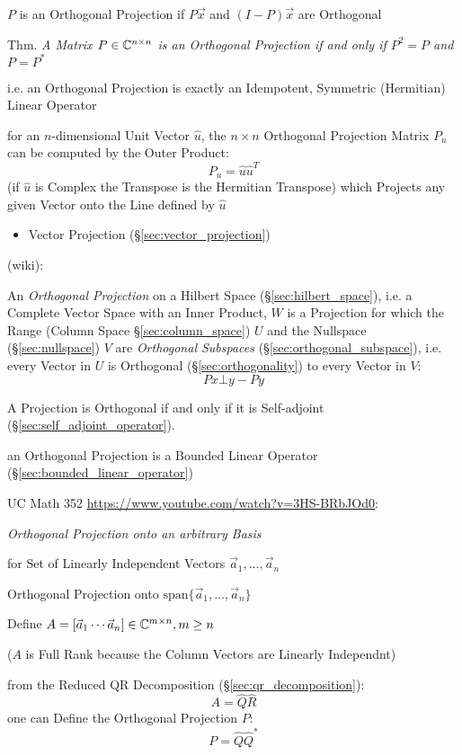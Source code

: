$P$ is an Orthogonal Projection if $P\vec{x}$ and $(I-P)\vec{x}$ are Orthogonal

Thm. \emph{A Matrix $P \in \mathbb{C}^{n \times n}$ is an Orthogonal Projection if
  and only if $P^2 = P$ and $P = P^*$}

i.e. an Orthogonal Projection is exactly an Idempotent, Symmetric (Hermitian)
Linear Operator

for an $n$-dimensional Unit Vector $\hat{u}$, the $n \times n$ Orthogonal
Projection Matrix $P_u$ can be computed by the Outer Product:
\[
  P_u = \hat{u}\hat{u}^T
\]
(if $\hat{u}$ is Complex the Transpose is the Hermitian Transpose) which
Projects any given Vector onto the Line defined by $\hat{u}$

\begin{itemize}
  \item Vector Projection (\S\ref{sec:vector_projection})
\end{itemize}

(wiki):

An \emph{Orthogonal Projection} on a Hilbert Space (\S\ref{sec:hilbert_space}),
i.e. a Complete Vector Space with an Inner Product,
$W$ is a Projection for which the Range (Column Space \S\ref{sec:column_space})
$U$ and the Nullspace (\S\ref{sec:nullspace}) $V$ are \emph{Orthogonal
  Subspaces} (\S\ref{sec:orthogonal_subspace}), i.e. every Vector in $U$ is
Orthogonal (\S\ref{sec:orthogonality}) to every Vector in $V$:
\[
  Px \bot y - Py
\]

A Projection is Orthogonal if and only if it is Self-adjoint
(\S\ref{sec:self_adjoint_operator}).

an Orthogonal Projection is a Bounded Linear Operator
(\S\ref{sec:bounded_linear_operator})


UC Math 352 \url{https://www.youtube.com/watch?v=3HS-BRbJOd0}:

\emph{Orthogonal Projection onto an arbitrary Basis}

for Set of Linearly Independent Vectors $\vec{a}_1, \ldots, \vec{a}_n$

Orthogonal Projection onto $\mathrm{span}\{\vec{a}_1, \ldots, \vec{a}_n\}$

Define $A = [\vec{a}_1 \cdots \vec{a}_n] \in \mathbb{C}^{m \times n}, m \geq n$

($A$ is Full Rank because the Column Vectors are Linearly Independnt)

from the Reduced QR Decomposition (\S\ref{sec:qr_decomposition}):
\[
  A = \hat{Q}\hat{R}
\]
one can Define the Orthogonal Projection $P$:
\[
  P = \hat{Q}\hat{Q}^*
\]


